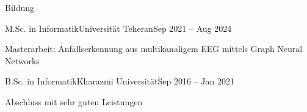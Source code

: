 \documentclass[]{main}
\begin{document}
\begin{section}{Bildung}
 \begin{subsectionnobullet}{M.Sc. in Informatik}{Universität Teheran}{Sep 2021 -- Aug 2024}{}
     \item Masterarbeit: Anfallserkennung aus multikanaligem EEG mittels Graph Neural Networks
 \end{subsectionnobullet}
 \begin{subsectionnobullet}{B.Sc. in Informatik}{Kharazmi Universität}{Sep 2016 -- Jan 2021}{}
     \item Abschluss mit sehr guten Leistungen
 \end{subsectionnobullet}
\end{section}

\end{document}
